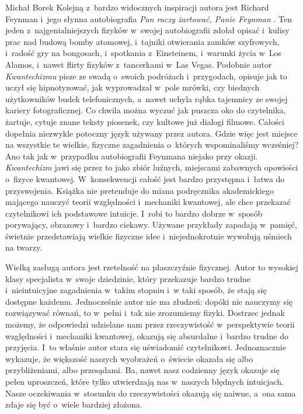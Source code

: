 \begin{newrevplenv}{Michał Borek}
Kolejną z~bardzo widocznych inspiracji autora jest Richard Feynman i~jego słynna autobiografia \textit{Pan raczy żartować, Panie Feynman}
\parencite*[][]{feynman_pan_1996}. %
 Ten jeden z~najgenialniejszych fizyków w~swojej autobiografii zdołał opisać i~kulisy prac nad budową bomby atomowej, i~tajniki otwierania zamków szyfrowych, i~radość gry na bongosach, i~spotkania z~Einsteinem, i~warunki życia w~Los Alamos, i~nawet flirty fizyków z~tancerkami w~Las Vegas. Podobnie autor \textit{Kwantechizmu} pisze ze swadą o~swoich podróżach i~przygodach, opisuje jak to uczył się hipnotyzować, jak wyprowadzał w~pole mrówki, czy biednych użytkowników budek telefonicznych, a~nawet uchyla rąbka tajemnicy ze swojej kariery fotograficznej. Co chwila można wyczuć jak puszcza oko do czytelnika, żartuje, cytuje znane teksty piosenek, czy kultowe już dialogi filmowe. Całości dopełnia niezwykle potoczny język używany przez autora. Gdzie więc jest miejsce na wszystkie te wielkie, fizyczne zagadnienia o~których wspominaliśmy wcześniej? Ano tak jak w~przypadku autobiografii Feynmana niejako przy okazji. \textit{Kwantechizm} jawi się przez to jako zbiór luźnych, miejscami zabawnych opowieści o~fizyce kwantowej. W~konsekwencji całość jest bardzo przystępna i~łatwa do przyswojenia. Książka nie pretenduje do miana podręcznika akademickiego mającego nauczyć teorii względności i~mechaniki kwantowej, ale chce przekazać czytelnikowi ich podstawowe intuicje. I~robi to bardzo dobrze w~sposób porywający, obrazowy i~bardzo ciekawy. Używane przykłady zapadają w~pamięć, świetnie przedstawiają wielkie fizyczne idee i~niejednokrotnie wywołują uśmiech na twarzy.

Wielką zasługą autora jest rzetelność na płaszczyźnie fizycznej. Autor to wysokiej klasy specjalista w~swoje dziedzinie, który przekazuje bardzo trudne i~nieintuicyjne zagadnienia w~takim stopniu i~w taki sposób, że stają się dostępne każdemu. Jednocześnie autor nie ma złudzeń: dopóki nie nauczymy się rozwiązywać równań, to w~pełni i~tak nie zrozumiemy fizyki. Dostrzec jednak możemy, że odpowiedzi udzielane nam przez rzeczywistość w~perspektywie teorii względności i~mechaniki kwantowej, okazują się absurdalne i~bardzo trudne do przyjęcia. I~to właśnie autor stara się uświadomić czytelnikowi. Jednoznacznie wykazuje, że większość naszych wyobrażeń o~świecie okazała się albo przybliżeniami, albo przesądami. Ba, nawet nasz codzienny język okazuje się pełen uproszczeń, które tylko utwierdzają nas w~naszych błędnych intuicjach. Nasze oczekiwania w~stosunku do rzeczywistości okazują się naiwne, a~ona sama zdaje się być o~wiele bardziej złożona.


\end{newrevplenv}
